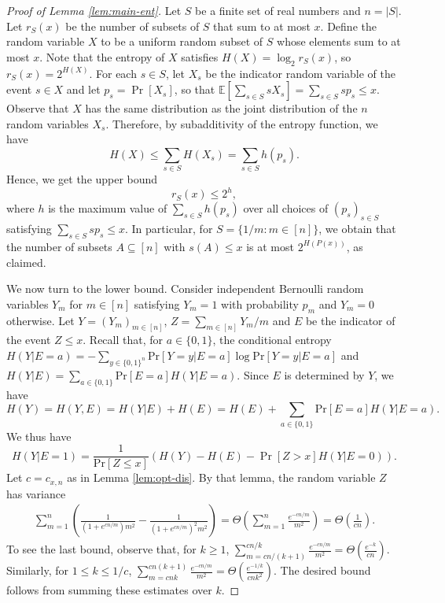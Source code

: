 \documentclass[10pt,a4paper]{amsart}
\newcommand{\pr}{\mathrm{Pr}}
\begin{document}
\begin{proof}[Proof of Lemma \ref{lem:main-ent}]
Let $S$ be a finite set of real numbers and $n=|S|$. Let $r_S(x)$ be the number of subsets of $S$ that sum to at most $x$. Define the random variable $X$ to be a uniform random subset of $S$ whose elements sum to at most $x$. Note that the entropy of $X$ satisfies $H(X)=\log_2 r_S(x)$, so $r_S(x)=2^{H(X)}$. For each $s \in S$, let $X_s$ be the indicator random variable of the event $s \in X$ and let $p_s = \Pr[X_s]$, so that $\mathbb{E}[\sum_{s\in S}s X_s]=\sum_{s \in S} sp_s \leq x$. Observe that $X$ has the same distribution as the joint distribution of the $n$ random variables $X_s$. Therefore, by subadditivity of the entropy function, we have 
\[
    H(X) \leq \sum_{s \in S}H(X_s)=\sum_{s \in S}h(p_s).
\]
Hence, we get the upper bound 
$$r_S(x) \leq 2^h,$$ 
where $h$ is the maximum value of $\sum_{s \in S} h(p_s)$ over all choices of $(p_s)_{s \in S}$ satisfying $\sum_{s \in S} sp_s \leq x$. In particular, for $S=\{1/m:m\in [n]\}$, we obtain that the number of subsets $A\subseteq [n]$ with $s(A)\le x$ is at most $2^{H(P(x))}$, as claimed. 


We now turn to the lower bound. Consider independent Bernoulli random variables $Y_m$ for $m \in [n]$ satisfying $Y_m=1$ with probability $p_m$ and $Y_m=0$ otherwise. Let $Y=(Y_m)_{m\in [n]}$, $Z=\sum_{m\in [n]} Y_m/m$ and $E$ be the indicator of the event $Z \le x$. Recall that, for $a\in \{0,1\}$, the conditional entropy $H(Y | E=a) = -\sum_{y\in \{0,1\}^n} \pr[Y=y | E=a] \log \pr[Y=y | E=a]$ and $H(Y | E) = \sum_{a\in \{0,1\}} \pr[E=a] H(Y | E=a)$. Since $E$ is determined by $Y$, we have 
\[
    H(Y) = H(Y,E) = H(Y|E) + H(E) = H(E) + \sum_{a\in \{0,1\}} \pr[E=a] H(Y | E=a).
\]
We thus have
\begin{equation}\label{eq:ent-decomp}
H(Y | E=1) = \frac{1}{\pr[Z\le x]}\left(H(Y) - H(E) - \Pr[Z>x] H(Y | E=0)\right). 
\end{equation}
Let $c=c_{x,n}$ as in Lemma \ref{lem:opt-dis}. By that lemma, the random variable $Z$ has variance 
\begin{align}\label{eq:2nd-mm}
    \sum_{m=1}^{n} \left(\frac{1}{(1+e^{cn/m})m^2} - \frac{1}{(1+e^{cn/m})^2m^2}\right) = \Theta\left(\sum_{m=1}^{n} \frac{e^{-cn/m}}{m^2}\right) = \Theta\left(\frac{1}{cn}\right). 
\end{align}
To see the last bound, observe that, for $k \ge 1$,  
$\sum_{m=cn/(k+1)}^{cn/k} \frac{e^{-cn/m}}{m^2} = \Theta(\frac{e^{-k}}{cn})$. Similarly, 
for $1\le k\le 1/c$, $\sum_{m=cnk}^{cn(k+1)} \frac{e^{-cn/m}}{m^2} = \Theta(\frac{e^{-1/k}}{cnk^2})$. The desired bound follows from summing these estimates over $k$. 


\end{proof}
\end{document}
